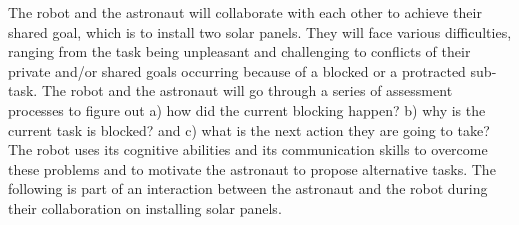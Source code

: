 \documentclass[12pt]{report}
\begin{document}
The robot and the astronaut will collaborate with each other to achieve their
shared goal, which is to install two solar panels. They will face various
difficulties, ranging from the task being unpleasant and challenging to
conflicts of their private and/or shared goals occurring because of a blocked or
a protracted sub-task. The robot and the astronaut will go through a series of
assessment processes to figure out a) how did the current blocking happen? b)
why is the current task is blocked? and c) what is the next action they are
going to take? The robot uses its cognitive abilities and its communication
skills to overcome these problems and to motivate the astronaut to propose
alternative tasks. The following is part of an interaction between the astronaut
and the robot during their collaboration on installing solar panels.\\
\end{document}
